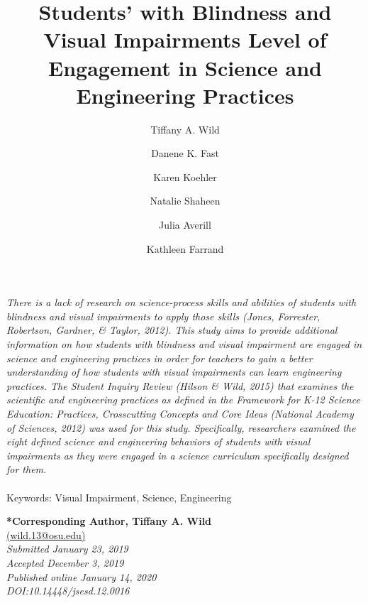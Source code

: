 \documentclass[11.5pt]{sig-alternate} %
\makeatletter
\let\oldabstract\abstract
\let\oldendabstract\endabstract
\renewenvironment{abstract} %
{\renewenvironment{quotation}%
               {\list{}{\addtolength{\leftmargin}{1em} %
                        \listparindent 1.5em%
                        \itemindent    \listparindent%
                        \rightmargin   \leftmargin%
                        \parsep        \z@ \@plus\p@}%
                \item\relax}%
               {\endlist}%
\oldabstract}
{\oldendabstract}
\makeatother
\begin{document}
\title{Students’ with Blindness and Visual Impairments Level of Engagement in Science and Engineering Practices}

\author[1]{\large \color{blue}Tiffany A. Wild}
\author[1]{\large \color{blue}Danene K. Fast}
\author[2]{\large \color{blue}Karen Koehler}
\author[3]{\large \color{blue}Natalie Shaheen}
\author[1]{\large \color{blue}Julia Averill}
\author[4]{\large \color{blue}Kathleen Farrand}



\toappear{}
\maketitle
\begin{@twocolumnfalse} 
\begin{abstract}
\item 
\textit {There is a lack of research on science-process skills and abilities of students with blindness and visual impairments to apply those skills (Jones, Forrester, Robertson, Gardner, \& Taylor, 2012). This study aims to provide additional information on how students with blindness and visual impairment are engaged in science and engineering practices in order for teachers to gain a better understanding of how students with visual impairments can learn engineering practices. The Student Inquiry Review (Hilson \& Wild, 2015) that examines the scientific and engineering practices as defined in the Framework for K-12 Science Education: Practices, Crosscutting Concepts and Core Ideas (National Academy of Sciences, 2012) was used for this study. Specifically, researchers examined the eight defined science and engineering behaviors of students with visual impairments as they were engaged in a science curriculum specifically designed for them.}
\\ \\
Keywords: Visual Impairment, Science, Engineering
\end{abstract}
\end{@twocolumnfalse}


\textbf{*Corresponding Author, Tiffany A. Wild }\\
\href{mailto: wild.13@osu.edu }{(wild.13@osu.edu)} \\
\textit{Submitted January 23, 2019 }\\
\textit{Accepted December 3, 2019} \\
\textit{Published online January 14, 2020} \\
\textit{DOI:10.14448/jsesd.12.0016 
}
\pagebreak
\clearpage
\end{document}
